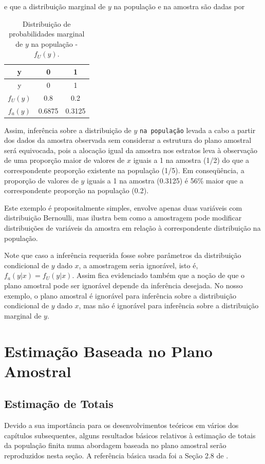 \documentclass[]{book}
\theoremstyle{definition}
\theoremstyle{definition}
\theoremstyle{definition}
\theoremstyle{remark}
\begin{document}
e que a distribuição marginal de \(y\) na população e na amostra são
dadas por

\begin{longtable}[]{@{}ccc@{}}
\caption{\label{tab:Tab28} Distribuição de probabilidades marginal de \(y\)
na população - \(f_U( y )\).}\tabularnewline
\toprule
y & 0 & 1\tabularnewline
\midrule
\endfirsthead
\toprule
y & 0 & 1\tabularnewline
\midrule
\endhead
\(f_U(y)\) & 0.8 & 0.2\tabularnewline
\(f_a(y)\) & 0.6875 & 0.3125\tabularnewline
\bottomrule
\end{longtable}

Assim, inferência sobre a distribuição de \(y\) \texttt{na\ população}
levada a cabo a partir dos dados da amostra observada sem considerar a
estrutura do plano amostral será equivocada, pois a alocação igual da
amostra nos estratos leva à observação de uma proporção maior de valores
de \(x\) iguais a 1 na amostra (1/2) do que a correspondente proporção
existente na população (1/5). Em conseqüência, a proporção de valores de
\(y\) iguais a 1 na amostra (0.3125) é 56\% maior que a correspondente
proporção na população (0.2).

Este exemplo é propositalmente simples, envolve apenas duas variáveis
com distribuição Bernoulli, mas ilustra bem como a amostragem pode
modificar distribuições de variáveis da amostra em relação à
correspondente distribuição na população.

Note que caso a inferência requerida fosse sobre parâmetros da
distribuição condicional de \(y\) dado \(x\), a amostragem seria
ignorável, isto é, \(f_a ( y | x) = f_U (y | x)\). Assim fica
evidenciado também que a noção de que o plano amostral pode ser
ignorável depende da inferência desejada. No nosso exemplo, o plano
amostral é ignorável para inferência sobre a distribuição condicional de
\(y\) dado \(x\), mas não é ignorável para inferência sobre a
distribuição marginal de \(y\).

\chapter{Estimação Baseada no Plano Amostral}\label{capplanamo}

\section{Estimação de Totais}\label{estimatotais}

Devido a sua importância para os desenvolvimentos teóricos em vários dos
capítulos subsequentes, alguns resultados básicos relativos à estimação
de totais da população finita numa abordagem baseada no plano amostral
serão reproduzidos nesta seção. A referência básica usada foi a Seção
2.8 de \citep{SSW92}.
\end{document}
